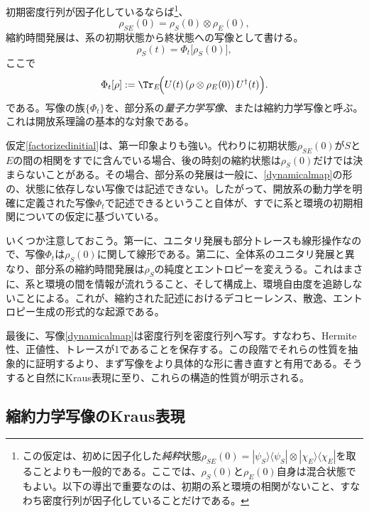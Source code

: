 \documentclass[a4paper,11pt,oneside]{article}
\theoremstyle{definition}
\numberwithin{equation}{section}
\begin{document}
初期密度行列が因子化しているならば\footnote{この仮定は、初めに因子化した\textit{純粋}状態$\rho_{SE}(0)=|\psi_S\rangle\langle\psi_S|\otimes|\chi_E\rangle\langle\chi_E|$を取ることよりも一般的である。ここでは、$\rho_S(0)$と$\rho_E(0)$自身は混合状態でもよい。以下の導出で重要なのは、初期の系と環境の相関がないこと、すなわち密度行列が因子化していることだけである。}、
\begin{equation}\label{factorizedinitial}
\rho_{SE}(0) = \rho_S(0)\otimes \rho_E(0) ,
\end{equation}
縮約時間発展は、系の初期状態から終状態への写像として書ける。
\begin{equation}
\rho_S(t) = \Phi_t\bigl[\rho_S(0)\bigr] ,
\end{equation}
ここで
\begin{equation}\label{dynamicalmap}
\Phi_t[\rho] := \Tr_E\!\Bigl(U(t)\,(\rho\otimes \rho_E(0))\,U^\dagger(t)\Bigr) .
\end{equation}
である。写像の族$\{\Phi_t\}$を、部分系の\textit{量子力学写像}、または縮約力学写像と呼ぶ。これは開放系理論の基本的な対象である。



仮定\eqref{factorizedinitial}は、第一印象よりも強い。代わりに初期状態$\rho_{SE}(0)$が$S$と$E$の間の相関をすでに含んでいる場合、後の時刻の縮約状態は$\rho_S(0)$だけでは決まらないことがある。その場合、部分系の発展は一般に、\eqref{dynamicalmap}の形の、状態に依存しない写像では記述できない。したがって、開放系の動力学を明確に定義された写像$\Phi_t$で記述できるということ自体が、すでに系と環境の初期相関についての仮定に基づいている。



いくつか注意しておこう。第一に、ユニタリ発展も部分トレースも線形操作なので、写像$\Phi_t$は$\rho_S(0)$に関して線形である。第二に、全体系のユニタリ発展と異なり、部分系の縮約時間発展は$\rho_S$の純度とエントロピーを変えうる。これはまさに、系と環境の間を情報が流れうること、そして構成上、環境自由度を追跡しないことによる。これが、縮約された記述におけるデコヒーレンス、散逸、エントロピー生成の形式的な起源である。



最後に、写像\eqref{dynamicalmap}は密度行列を密度行列へ写す。すなわち、Hermite性、正値性、トレースが1であることを保存する。この段階でそれらの性質を抽象的に証明するより、まず写像をより具体的な形に書き直すと有用である。そうすると自然にKraus表現に至り、これらの構造的性質が明示される。






\subsection{縮約力学写像のKraus表現}
\end{document}
